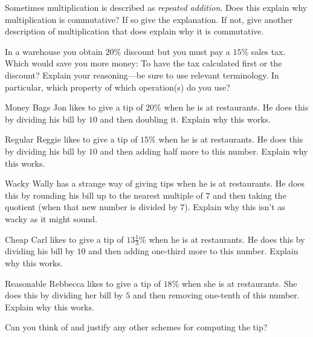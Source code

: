 \documentclass[nooutcomes]{ximera}
\begin{document}
\begin{problem}Sometimes multiplication is described as \textit{repeated
  addition}. Does this explain why multiplication is commutative? If
  so give the explanation. If not, give another description of
  multiplication that does explain why it is commutative.
\end{problem} 

\begin{problem}In a warehouse you obtain $20\%$ discount but you must pay a
  $15\%$ sales tax. Which would save you more money: To have the tax
  calculated first or the discount? Explain your reasoning---be sure
  to use relevant terminology.  In particular, which property 
of which operation(s) do you use?  
\end{problem} 

\begin{problem}Money Bags Jon likes to give a tip of $20$\% when he is at
  restaurants. He does this by dividing his bill by $10$ and then
  doubling it. Explain why this works.
\end{problem} 

\begin{problem}Regular Reggie likes to give a tip of $15$\% when he is at
  restaurants. He does this by dividing his bill by $10$ and then
  adding half more to this number. Explain why this works.
\end{problem} 

\begin{problem}Wacky Wally has a strange way of giving tips when he is at
  restaurants. He does this by rounding his bill up to the nearest
  multiple of $7$ and then taking the quotient (when that new number
  is divided by $7$). Explain why this isn't as wacky as it might
  sound.
\end{problem} 

\begin{problem}Cheap Carl likes to give a tip of $13\frac{1}{3}$\% when he is
  at restaurants. He does this by dividing his bill by $10$ and then
  adding one-third more to this number. Explain why this works.
\end{problem} 

\begin{problem}Reasonable Rebbecca likes to give a tip of $18$\% when she is at
  restaurants. She does this by dividing her bill by $5$ and then
  removing one-tenth of this number. Explain why this works.
\end{problem} 

\begin{problem}Can you think of and justify any other schemes for computing the
  tip?
\end{problem} 
\end{document}
